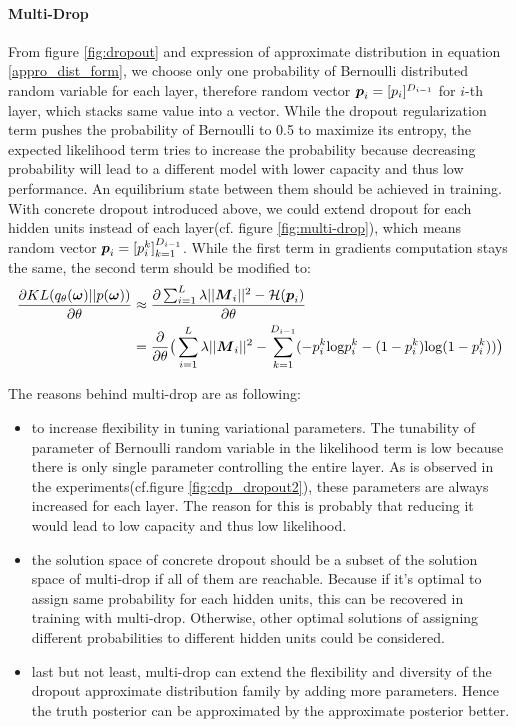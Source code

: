 \paragraph{Multi-Drop}
From figure \ref{fig:dropout} and expression of approximate distribution in equation \ref{appro_dist_form}, we choose only one probability of Bernoulli distributed random variable for each layer, therefore random vector $\boldsymbol p_i = [p_i]^{D_{i-1}}$ for $i$-th layer, which stacks same value into a vector. While the dropout regularization term pushes the probability of Bernoulli to 0.5 to maximize its entropy, the expected likelihood term tries to increase the probability because decreasing probability will lead to a different model with lower capacity and thus low performance. An equilibrium state between them should be achieved in training. With concrete dropout introduced above, we could extend dropout for each hidden units instead of each layer(cf. figure \ref{fig:multi-drop}), which means random vector $\boldsymbol p_i = [p_i^k]_{k=1}^{D_{i-1}}$. While the first term in gradients computation stays the same, the second term should be modified to:
\begin{equation} 
\begin{aligned}\label{KL_grad_multi}
\frac{\partial KL(q_{\theta}(\boldsymbol \omega)||p(\boldsymbol \omega))}{\partial \theta} 
&\approx \frac{\partial \sum_{i=1}^{L}\lambda||\boldsymbol M_{i}||^{2}- \mathcal H(\boldsymbol p_{i})}{\partial \theta}  \\
&= \frac{\partial}{\partial \theta} \big( \sum_{i=1}^{L}\lambda||\boldsymbol M_{i}||^{2}- \sum_{k=1}^{D_{i-1}}(-p_i^k\text{log}p_i^k - (1-p_i^k)\text{log}(1-p_i^k))\big)
\end{aligned}
\end{equation}  

The reasons behind multi-drop are as following:
\begin{itemize}
\item to increase flexibility in tuning variational parameters. The tunability of parameter of Bernoulli random variable in the likelihood term is low because there is only single parameter controlling the entire layer. As is observed in the experiments(cf.figure \ref{fig:cdp_dropout2}), these parameters are always increased for each layer. The reason for this is probably that reducing it would lead to low capacity and thus low likelihood. 

\item the solution space of concrete dropout should be a subset of the solution space of multi-drop if all of them are reachable. Because if it's optimal to assign same probability for each hidden units, this can be recovered in training with multi-drop. Otherwise, other optimal solutions of assigning different probabilities to different hidden units could be considered.

\item last but not least, multi-drop can extend the flexibility and diversity of the dropout approximate distribution family by adding more parameters. Hence the truth posterior can be approximated by the approximate posterior better.
 
\end{itemize}


